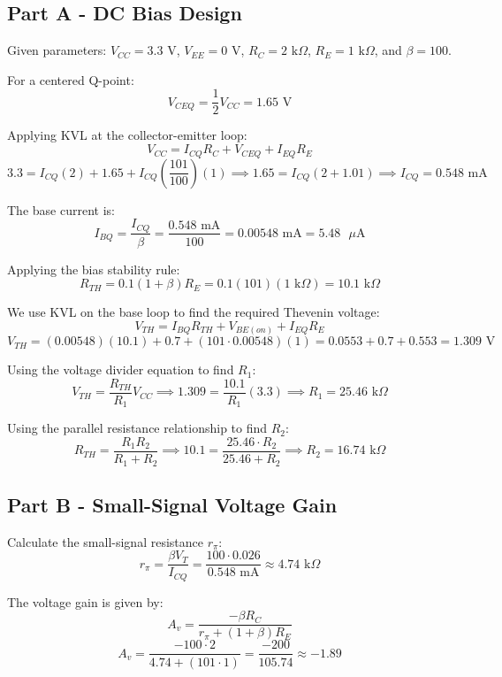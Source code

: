\documentclass{article}
\begin{document}
\subsection{Part A - DC Bias Design}
Given parameters: $V_{CC} = 3.3 \text{ V}$, $V_{EE} = 0 \text{ V}$, $R_C = 2 \text{ k}\Omega$, $R_E = 1 \text{ k}\Omega$, and $\beta = 100$.

For a centered Q-point:
$$ V_{CEQ} = \frac{1}{2} V_{CC} = 1.65 \text{ V} $$

Applying KVL at the collector-emitter loop:
$$ V_{CC} = I_{CQ} R_C + V_{CEQ} + I_{EQ} R_E $$
$$ 3.3 = I_{CQ}(2) + 1.65 + I_{CQ}\left(\frac{101}{100}\right)(1) \implies 1.65 = I_{CQ}(2 + 1.01) \implies I_{CQ} = 0.548 \text{ mA} $$

The base current is:
$$ I_{BQ} = \frac{I_{CQ}}{\beta} = \frac{0.548 \text{ mA}}{100} = 0.00548 \text{ mA} = 5.48 \text{ }\mu\text{A} $$

Applying the bias stability rule:
$$ R_{TH} = 0.1(1 + \beta)R_E = 0.1(101)(1 \text{ k}\Omega) = 10.1 \text{ k}\Omega $$

We use KVL on the base loop to find the required Thevenin voltage:
$$ V_{TH} = I_{BQ} R_{TH} + V_{BE(on)} + I_{EQ} R_E $$
$$ V_{TH} = (0.00548)(10.1) + 0.7 + (101 \cdot 0.00548)(1) = 0.0553 + 0.7 + 0.553 = 1.309 \text{ V} $$

Using the voltage divider equation to find $R_1$:
$$ V_{TH} = \frac{R_{TH}}{R_1} V_{CC} \implies 1.309 = \frac{10.1}{R_1} (3.3) \implies R_1 = 25.46 \text{ k}\Omega $$

Using the parallel resistance relationship to find $R_2$:
$$ R_{TH} = \frac{R_1 R_2}{R_1 + R_2} \implies 10.1 = \frac{25.46 \cdot R_2}{25.46 + R_2} \implies R_2 = 16.74 \text{ k}\Omega $$

\subsection{Part B - Small-Signal Voltage Gain}
Calculate the small-signal resistance $r_\pi$:
$$ r_\pi = \frac{\beta V_T}{I_{CQ}} = \frac{100 \cdot 0.026}{0.548 \text{ mA}} \approx 4.74 \text{ k}\Omega $$

The voltage gain is given by:
$$ A_v = \frac{-\beta R_C}{r_\pi + (1 + \beta)R_E} $$
$$ A_v = \frac{-100 \cdot 2}{4.74 + (101 \cdot 1)} = \frac{-200}{105.74} \approx -1.89 $$
\end{document}
